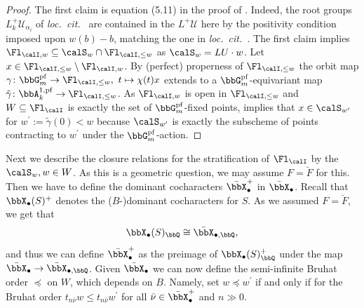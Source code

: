 \documentclass[10pt, reqno]{amsart}
\theoremstyle{plain}
\theoremstyle{definition}
\numberwithin{equation}{section}
\begin{document}
	\begin{proof}
		The first claim is equation (5.11) in the proof of \cite[Lemma 5.3]{AGLR22}. Indeed, the root groups $L^+_k\mathcal{U}_{\alpha_i}$ of {\it loc.~cit.~} are contained in the $L^+\mathcal{U}$ here by the positivity condition imposed upon $w(b)-b$, matching the one in {\it loc.~cit.~}. The first claim implies $\Fl_{\calI,w}\subseteq \calS_w\cap \Fl_{\calI,\leq w}$ as $\calS_w=LU\cdot w$. Let $x\in \Fl_{\calI,\leq w}\setminus \Fl_{\calI,w}$. By (perfect) properness of $\Fl_{\calI,\leq w}$ the orbit map $\gamma\colon \bbG_{m}^\mathrm{pf}\to \Fl_{\calI,\leq w},\ t\mapsto \chi(t)x$ extends to a $\bbG_m^\mathrm{pf}$-equivariant map $\tilde{\gamma}\colon \bbA^{1,\mathrm{pf}}_{k}\to \Fl_{\calI,\leq w}$. As $\Fl_{\calI,w}$ is open in $\Fl_{\calI,\leq w}$ and $W\subseteq \Fl_{\calI}$ is exactly the set of $\bbG_{m}^\mathrm{pf}$-fixed points,  implies that $x\in \calS_{w^\prime}$ for $w^\prime:=\tilde{\gamma}(0)<w$ because $\calS_{w^\prime}$ is exactly the subscheme of points contracting to $w^\prime$ under the $\bbG_{m}^\mathrm{pf}$-action.
	\end{proof}
	
	Next we describe the closure relations for the stratification of $\Fl_{\calI}$ by the $\calS_w, w\in W$.
	As this is a geometric question, we may assume $F=\breve{F}$ for this. Then we have to define the dominant cocharacters $\bar{\bbX}_{\bullet}^+$ in $\bar{\bbX}_\bullet$. Recall that $\bbX_\bullet(S)^+$ denotes the ($B$-)dominant cocharacters for $S$. As we assumed $F=\breve{F}$, we get that
	\begin{equation}
		\bbX_\bullet(S)_\bbQ\cong \bar{\bbX}_{\bullet,\bbQ},
	\end{equation}
	and thus we can define $\bar{\bbX}_\bullet^+$ as the preimage of $\bbX_\bullet(S)_\bbQ^+$ under the map $\bar{\bbX}_\bullet\to \bar{\bbX}_{\bullet,\bbQ}$. 	Given $\bar{\bbX}_\bullet$ we can now define the semi-infinite Bruhat order $\preceq$ on $W$, which depends on $B$. Namely, set $w\preceq w^\prime$ if and only if for the Bruhat order $t_{n\bar{\nu}}w\leq t_{n\bar{\nu}}w^\prime$ for all $\bar{\nu}\in \bar{\bbX}_\bullet^+$ and $n\gg 0$.
	
\end{document}

